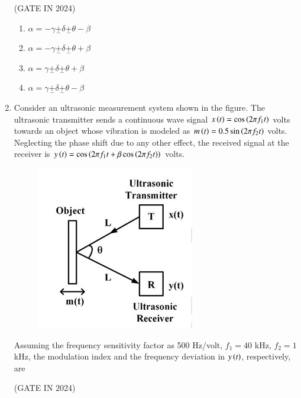 \documentclass[journal,12pt,onecolumn]{IEEEtran}
\theoremstyle{remark}
\begin{document}
\begin{enumerate}
    \hfill{(GATE IN 2024)}
    \begin{enumerate}
        \item $\alpha = -\gamma \underset{-}{+} \delta \underset{-}{+} \theta - \beta$
        \item $\alpha = -\gamma \underset{-}{+} \delta \underset{-}{+} \theta + \beta$
        \item $\alpha = \gamma \underset{-}{+} \delta \underset{-}{+} \theta + \beta$
        \item $\alpha = \gamma \underset{-}{+} \delta \underset{-}{+} \theta - \beta$
    \end{enumerate}

    \item Consider an ultrasonic measurement system shown in the figure.  The ultrasonic transmitter  sends a continuous wave signal $x\left(t\right) = \cos\left(2\pi f_1 t\right)$ volts towards an object whose vibration is modeled as $m\left(t\right) = 0.5 \sin\left(2\pi f_2 t\right)$ volts. Neglecting the phase shift due to any other effect, the received signal at the receiver  is $y\left(t\right) = \cos\left(2\pi f_1 t + \beta \cos\left(2\pi f_2 t\right)\right)$ volts.
    \begin{figure}[H]
        \centering
        \includegraphics[width=0.3\columnwidth]{figs/p25.jpg}
        \caption*{}
        \label{fig:p25}
    \end{figure}
    
    Assuming the frequency sensitivity factor as 500 Hz/volt, $f_1 = 40$ kHz, $f_2 = 1$ kHz, the modulation index \brak{\beta} and the frequency deviation in $y\left(t\right)$, respectively, are
    
    \hfill{(GATE IN 2024)}
    \begin{enumerate}
    \end{enumerate}
    

\end{enumerate}
\end{document}
